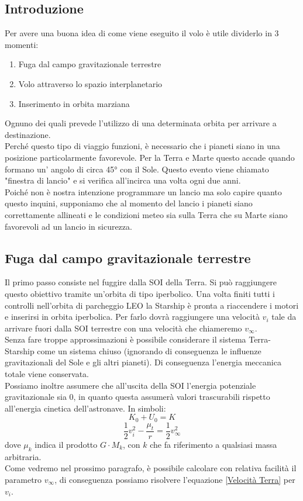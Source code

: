 \subsection{Introduzione}
Per avere una buona idea di come viene eseguito il volo è utile dividerlo in 3 momenti:
\begin{enumerate}
    \item Fuga dal campo gravitazionale terrestre
    \item Volo attraverso lo spazio interplanetario
    \item Inserimento in orbita marziana
\end{enumerate}
Ognuno dei quali prevede l'utilizzo di una determinata orbita per arrivare a destinazione.\\
Perché questo tipo di viaggio funzioni, è necessario che i pianeti siano in una posizione particolarmente favorevole. Per la Terra e Marte questo accade quando formano un' angolo di circa 45° con il Sole. Questo evento viene chiamato "finestra di lancio" e si verifica all'incirca una volta ogni due anni.\\
Poiché non è nostra intenzione programmare un lancio ma solo capire quanto questo inquini, supponiamo che al momento del lancio i pianeti siano correttamente allineati e le condizioni meteo sia sulla Terra che su Marte siano favorevoli ad un lancio in sicurezza.
\subsection{Fuga dal campo gravitazionale terrestre}
Il primo passo consiste nel fuggire dalla SOI della Terra. Si può raggiungere questo obiettivo tramite un'orbita di tipo iperbolico.
Una volta finiti tutti i controlli nell'orbita di parcheggio LEO la Starship è pronta a riaccendere i motori e inserirsi in orbita iperbolica.
Per farlo dovrà raggiungere una velocità $v_i$ tale da arrivare fuori dalla SOI terrestre con una velocità che chiameremo $v_\infty$.\\
Senza fare troppe approssimazioni è possibile considerare il sistema Terra-Starship come un sistema chiuso (ignorando di conseguenza le influenze gravitazionali del Sole e gli altri pianeti). Di conseguenza l'energia meccanica totale viene conservata.\\
Possiamo inoltre assumere che all'uscita della SOI l'energia potenziale gravitazionale sia 0, in quanto questa assumerà valori trascurabili rispetto all'energia cinetica dell'astronave. In simboli:
$$K_0 + U_0 = K$$
\begin{equation}
    \label{Velocità Terra}
    \frac{1}{2}v_i^2 - \frac{\mu_t}{r} = \frac{1}{2}v_{\infty}^2
\end{equation}
dove $\mu_k$ indica il prodotto $G \cdot M_k$, con $k$ che fa riferimento a qualsiasi massa arbitraria.\\
Come vedremo nel prossimo paragrafo, è possibile calcolare con relativa facilità il parametro $v_\infty$, di conseguenza possiamo risolvere l'equazione \ref{Velocità Terra} per $v_i$.

